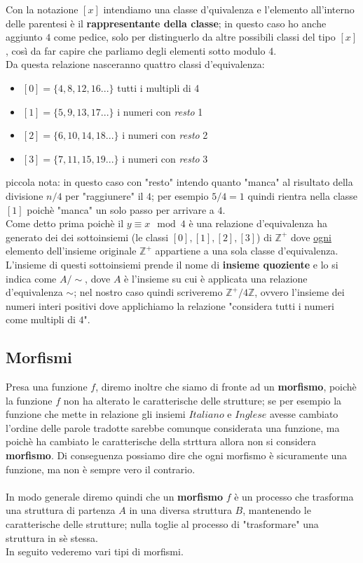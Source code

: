 Con la notazione \([x]\) intendiamo una classe d'quivalenza e l'elemento 
all'interno delle parentesi è il \textbf{rappresentante della classe}; in questo
caso ho anche aggiunto \(4\) come pedice, solo per distinguerlo da altre possibili 
classi del tipo \([x]\), così da far capire che parliamo degli elementi sotto modulo 4. \\
Da questa relazione nasceranno quattro classi d'equivalenza:
\begin{itemize}
  \item \([0] = \{ 4, 8, 12, 16 ... \}\) tutti i multipli di 4
  \item \([1] = \{ 5, 9, 13, 17 ... \}\) i numeri con \emph{resto} 1
  \item \([2] = \{ 6, 10, 14, 18 ... \}\) i numeri con \emph{resto} 2
  \item \([3] = \{  7, 11, 15, 19 ...\}\) i numeri con \emph{resto} 3
\end{itemize}
piccola nota: in questo caso con "resto" intendo quanto "manca" al risultato 
della divisione \(n / 4\) per "raggiunere" il \(4\); per esempio \(5/4 = 1\) 
quindi rientra nella classe \([1]\) poichè "manca" un solo passo per 
arrivare a \(4\). \\
Come detto prima poichè il \(y \equiv x \mod 4\) è una relazione d'equivalenza
ha generato dei dei sottoinsiemi (le classi \([0],[1],[2],[3]\)) di 
\(\mathbb{Z}^+\) dove \underline{ogni} elemento dell'insieme originale
\(\mathbb{Z}^+\) appartiene a una sola classe d'equivalenza. \\
L'insieme di questi sottoinsiemi prende il nome di \textbf{insieme quoziente} e lo
si indica come \(A / \sim \), dove \(A\) è l'insieme su cui è applicata 
una relazione d'equivalenza \(\sim\); nel nostro caso quindi scriveremo 
\( \mathbb{Z}^+ / 4\mathbb{Z} \), ovvero l'insieme dei numeri interi positivi
dove applichiamo la relazione "considera tutti i numeri come multipli di \(4\)".

\subsection{Morfismi}
Presa una funzione \(f\), diremo inoltre che siamo di fronte ad un \textbf{morfismo},
poichè la funzione \(f\) non ha alterato le caratterische delle strutture; se 
per esempio la funzione che mette in relazione gli insiemi \(Italiano\) e \(Inglese\)
avesse cambiato l'ordine delle parole tradotte sarebbe
comunque considerata una funzione, ma poichè ha cambiato le caratterische della strttura
allora non si considera \textbf{morfismo}. Di conseguenza possiamo dire che ogni 
morfismo è sicuramente una funzione, ma non è sempre vero il contrario.
\\
\\
In modo generale diremo quindi che un \textbf{morfismo} \(f\) è un processo che
trasforma una struttura di partenza \(A\) in una diversa struttura \(B\), 
mantenendo le caratterische delle strutture; 
nulla toglie al processo di "trasformare" una struttura in sè stessa. \\
In seguito vederemo vari tipi di morfismi.

